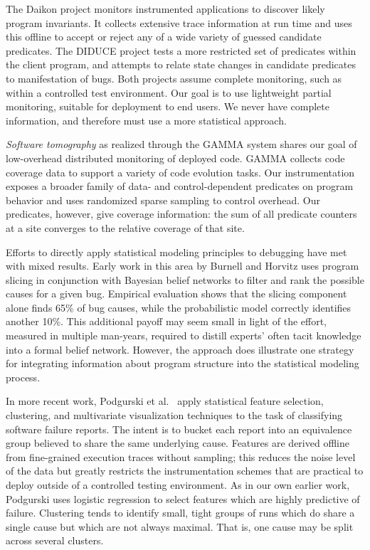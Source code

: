 \documentclass[draft]{sig-alternate}
\newcommand{\termdef}[1]{\textit{#1}}
\begin{document}
The Daikon project \cite{ernst2001} monitors instrumented applications
to discover likely program invariants.  It collects extensive trace
information at run time and uses this offline to accept or reject any
of a wide variety of guessed candidate predicates.  The DIDUCE project
\cite{ICSE02*291} tests a more restricted set of predicates within the
client program, and attempts to relate state changes in candidate
predicates to manifestation of bugs.  Both projects assume complete
monitoring, such as within a controlled test environment.  Our goal is
to use lightweight partial monitoring, suitable for deployment to end
users.  We never have complete information, and therefore must use a
more statistical approach.

\termdef{Software tomography} as realized through the GAMMA system
\cite{PASTE'02*2,Orso:2003:LFDIART} shares our goal of low-overhead
distributed monitoring of deployed code.  GAMMA collects code coverage
data to support a variety of code evolution tasks.  Our
instrumentation exposes a broader family of data- and
control-dependent predicates on program behavior and uses randomized
sparse sampling to control overhead.  Our
predicates, however, give coverage information: the sum of all predicate counters at a site converges to the relative coverage of that site.

Efforts to directly apply statistical modeling principles to debugging
have met with mixed results.  Early work in this area by Burnell and
Horvitz \cite{Burnell:1995:SCM} uses program slicing in conjunction
with Bayesian belief networks to filter and rank the possible causes
for a given bug.  Empirical evaluation shows that the slicing component
alone finds 65\% of bug causes, while the probabilistic model
correctly identifies another 10\%.  This additional payoff may seem
small in light of the effort, measured in multiple
man-years, required to distill experts' often tacit knowledge into a
formal belief network.  However, the approach does illustrate one
strategy for integrating information about program structure into the
statistical modeling process.

In more recent work, Podgurski et al.\ \cite{ICSE`03*465} apply
statistical feature selection, clustering, and multivariate
visualization techniques to the task of classifying software failure
reports.  The intent is to bucket each report into an equivalence
group believed to share the same underlying cause.  Features are
derived offline from fine-grained execution traces without sampling;
this reduces the noise level of the data but greatly restricts the
instrumentation schemes that are practical to deploy outside of a
controlled testing environment.  As in our own earlier work, Podgurski
uses logistic regression to select features which are highly
predictive of failure.  
Clustering tends to identify small, tight groups of runs which do
share a single cause but which are not always maximal.  That is, one
cause may be split across several clusters.
\end{document}
